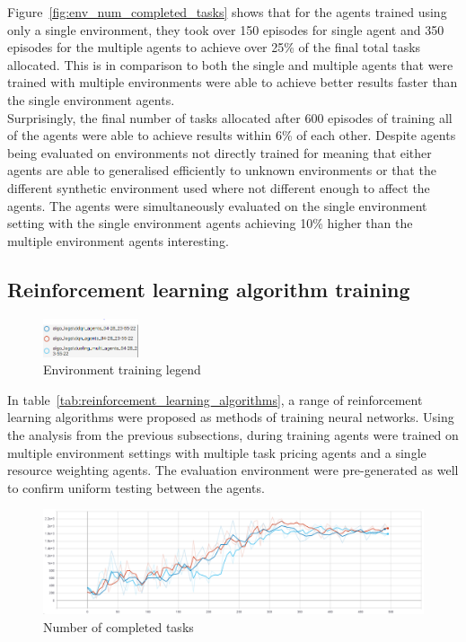 Figure~\ref{fig:env_num_completed_tasks} shows that for the agents trained using only a single environment, they took
over 150 episodes for single agent and 350 episodes for the multiple agents to achieve over 25\% of the final total
tasks allocated. This is in comparison to both the single and multiple agents that were trained with multiple
environments were able to achieve better results faster than the single environment agents. \\
Surprisingly, the final number of tasks allocated after 600 episodes of training all of the agents were able to achieve
results within 6\% of each other. Despite agents being evaluated on environments not directly trained for meaning that
either agents are able to generalised efficiently to unknown environments or that the different synthetic environment
used where not different enough to affect the agents. The agents were simultaneously evaluated on the single environment
setting with the single environment agents achieving 10\% higher than the multiple environment agents interesting.

\subsection{Reinforcement learning algorithm training}\label{subsec:reinforcement-learning-algorithm-training}
\begin{figure}
    \includegraphics[width=0.25\textwidth]{figures/5_evaluation_figs/algo_training_fig/legend.PNG}
    \caption{Environment training legend}
    \label{fig:algo-training-legend}
\end{figure}

In table~\ref{tab:reinforcement_learning_algorithms}, a range of reinforcement learning algorithms were proposed as
methods of training neural networks. Using the analysis from the previous subsections, during training agents were
trained on multiple environment settings with multiple task pricing agents and a single resource weighting agents.
The evaluation environment were pre-generated as well to confirm uniform testing between the agents. \\

\begin{figure}[H]
    \centering
    \includegraphics[width=\linewidth]{figures/5_evaluation_figs/algo_training_fig/num_completed_tasks.PNG}
    \caption{Number of completed tasks}
    \label{fig:algo_num_completed_tasks}
\end{figure}

